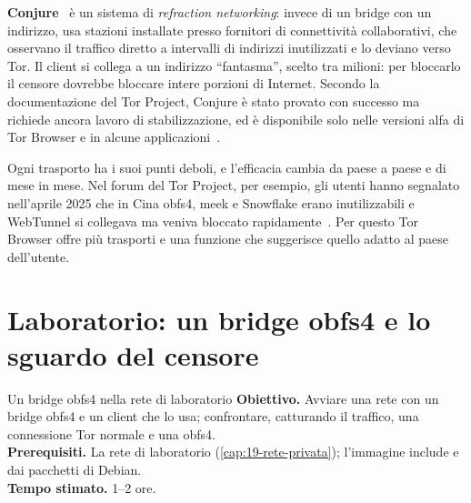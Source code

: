 \textbf{Conjure}~\cite{frolov2019conjure} è un sistema di \emph{refraction networking}: invece di un bridge con un indirizzo, usa stazioni installate presso fornitori di connettività collaborativi, che osservano il traffico diretto a intervalli di indirizzi inutilizzati e lo deviano verso Tor. Il client si collega a un indirizzo \enquote{fantasma}, scelto tra milioni: per bloccarlo il censore dovrebbe bloccare intere porzioni di Internet. Secondo la documentazione del Tor Project, Conjure è stato provato con successo ma richiede ancora lavoro di stabilizzazione, ed è disponibile solo nelle versioni alfa di Tor Browser e in alcune applicazioni~\cite{torsupport}.

\begin{attenzione}
Ogni trasporto ha i suoi punti deboli, e l'efficacia cambia da paese a paese e di mese in mese. Nel forum del Tor Project, per esempio, gli utenti hanno segnalato nell'aprile 2025 che in Cina obfs4, meek e Snowflake erano inutilizzabili e WebTunnel si collegava ma veniva bloccato rapidamente~\cite{forumcina2025}. Per questo Tor Browser offre più trasporti e una funzione che suggerisce quello adatto al paese dell'utente.
\end{attenzione}

\section{Laboratorio: un bridge obfs4 e lo sguardo del censore}\label{sec:lab-censura}

\begin{laboratorio}[10]{Un bridge obfs4 nella rete di laboratorio}
\textbf{Obiettivo.} Avviare una rete con un bridge obfs4 e un client che lo usa; confrontare, catturando il traffico, una connessione Tor normale e una obfs4.\\
\textbf{Prerequisiti.} La rete di laboratorio (\cref{cap:19-rete-privata}); l'immagine include  e  dai pacchetti di Debian.\\
\textbf{Tempo stimato.} 1--2 ore.
\end{laboratorio}

